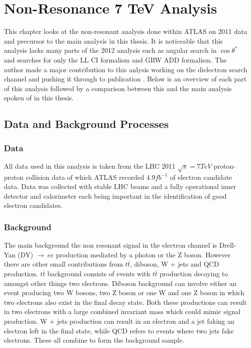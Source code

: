 \chapter{Non-Resonance 7 TeV Analysis}
\label{ch:7tev}

This chapter looks at the non-resonant analysis done within ATLAS on 2011 data and precursor to the main analysis in this thesis. It is noticeable that this analysis lacks many parts of the 2012 analysis such as angular search in $\cos{\theta^{*}}$ and searches for only the LL CI formalism and GRW ADD formalism. The author made a major contribution to this anlysis working on the dielectron search channel and pushing it through to publication \cite{PhysRevD.87.015010}. Below is an overview of each part of this analysis followed by a comparison between this and the main analysis spoken of in this thesis.




\section{Data and Background Processes}

\subsection*{Data}
	All data used in this analysis is taken from the LHC 2011 $\sqrt{s} = 7 TeV$ proton-proton collision data of which ATLAS recorded $4.9 fb^{-1}$ of electron candidate data. Data was collected with stable LHC beams and a fully operational inner detector and calorimeter each being important in the identification of good electron candidates.

\subsection*{Background}
	The main background the non resonant signal in the electron channel is Drell-Yan (DY) $\rightarrow~ee$ production mediated by a photon or the Z boson. However there are other small contributions from $t\bar{t}$, diboson, W + jets and QCD production. $t\bar{t}$ background consists of events with $t\bar{t}$ production decaying to amongst other things two electrons. Diboson background can involve either an event producing two W bosons, two Z boson or one W and one Z boson in which two electrons also exist in the final decay state. Both these productions can result in two electrons with a large combined invariant mass which could mimic signal production. W + jets production can result in an electron and a jet faking an electron left in the final state, while QCD refers to events where two jets fake electrons. These all combine to form the background sample.

